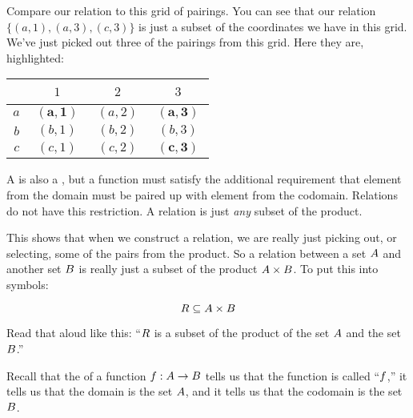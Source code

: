 \documentclass[../../../main.tex]{subfiles}
\begin{document}
Compare our relation to this grid of pairings. You can see that our relation $\{ (a, 1), (a, 3), (c, 3) \}$ is just a subset of the coordinates we have in this grid. We've just picked out three of the pairings from this grid. Here they are, highlighted:

\begin{center}
  \begin{tabular}{| c | c | c | c |}
    \hline
    ~   & $1$        & $2$        & $3$        \\ \hline
    $a$ & \textcolor{vocabcolor}{$~\mathbf{(a, 1)}~$} & $~(a, 2)~$ & \textcolor{vocabcolor}{$~\mathbf{(a, 3)}~$} \\ \hline
    $b$ & $~(b, 1)~$ & $~(b, 2)~$ & $~(b, 3)~$ \\ \hline
    $c$ & $~(c, 1)~$ & $~(c, 2)~$ & \textcolor{vocabcolor}{$~\mathbf{(c, 3)}~$} \\ \hline
  \end{tabular}
\end{center}

\begin{aside}
  \begin{remark}
    A  is also a , but a function must satisfy the additional requirement that  element from the domain must be paired up with  element from the codomain. Relations do not have this restriction. A relation is just \emph{any} subset of the product.
  \end{remark}
\end{aside}

This shows that when we construct a relation, we are really just picking out, or selecting, some of the pairs from the product. So a relation between a set $A$ and another set $B$ is really just a subset of the product $A \times B$. To put this into symbols:

\begin{equation*}
  R \subseteq A \times B
\end{equation*}

Read that aloud like this: ``$R$ is a subset of the product of the set $A$ and the set $B$.''

\begin{aside}
  \begin{remark}
    Recall that the  of a function $f: A \rightarrow B$ tells us that the function is called ``$f$,'' it tells us that the domain is the set $A$, and it tells us that the codomain is the set $B$.
  \end{remark}
\end{aside}
\end{document}
